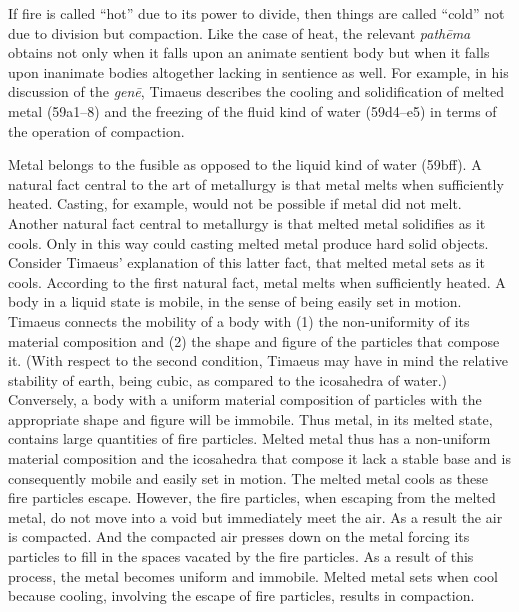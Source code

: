 If fire is called ``hot'' due to its power to divide, then things are called ``cold'' not due to division but compaction. Like the case of heat, the relevant \emph{pathēma} obtains not only when it falls upon an animate sentient body but when it falls upon inanimate bodies altogether lacking in sentience as well. For example, in his discussion of the \emph{genē}, Timaeus describes the cooling and solidification of melted metal (59a1--8) and the freezing of the fluid kind of water (59d4--e5) in terms of the operation of compaction. 

Metal belongs to the fusible as opposed to the liquid kind of water (59bff). A natural fact central to the art of metallurgy is that metal melts when sufficiently heated. Casting, for example, would not be possible if metal did not melt. Another natural fact central to metallurgy is that melted metal solidifies as it cools. Only in this way could casting melted metal produce hard solid objects. Consider Timaeus' explanation of this latter fact, that melted metal sets as it cools. According to the first natural fact, metal melts when sufficiently heated. A body in a liquid state is mobile, in the sense of being easily set in motion. Timaeus connects the mobility of a body with (1) the non-uniformity of its material composition and (2) the shape and figure of the particles that compose it. (With respect to the second condition, Timaeus may have in mind the relative stability of earth, being cubic, as compared to the icosahedra of water.) Conversely, a body with a uniform material composition of particles with the appropriate shape and figure will be immobile. Thus metal, in its melted state, contains large quantities of fire particles. Melted metal thus has a non-uniform material composition and the icosahedra that compose it lack a stable base and is consequently mobile and easily set in motion. The melted metal cools as these fire particles escape. However, the fire particles, when escaping from the melted metal, do not move into a void but immediately meet the air. As a result the air is compacted. And the compacted air presses down on the metal forcing its particles to fill in the spaces vacated by the fire particles. As a result of this process, the metal becomes uniform and immobile. Melted metal sets when cool because cooling, involving the escape of fire particles, results in compaction.


